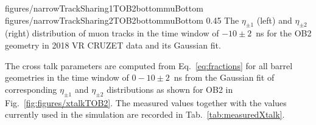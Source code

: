                  {figures/narrowTrackSharing1TOB2bottommuBottom}
                 {figures/narrowTrackSharing2TOB2bottommuBottom} %
                 {0.45}       %
                 { The $\eta_{\pm 1}$ (left) and  $\eta_{\pm 2}$ (right) distribution of muon tracks in the time window of $-10 \pm 2$~ns for the OB2 geometry in 2018 VR CRUZET data and its Gaussian fit.}




The cross talk parameters are computed from Eq.~\ref{eq:fractions} for all barrel geometries in the time window of $0-10 \pm 2$~ns from the Gaussian fit of corresponding  $\eta_{\pm 1}$ and $\eta_{\pm 2}$ distributions as shown for OB2 in Fig.~\ref{fig:figures/xtalkTOB2}. The measured values together with the values currently used in the simulation are recorded in Tab.~\ref{tab:measuredXtalk}.


